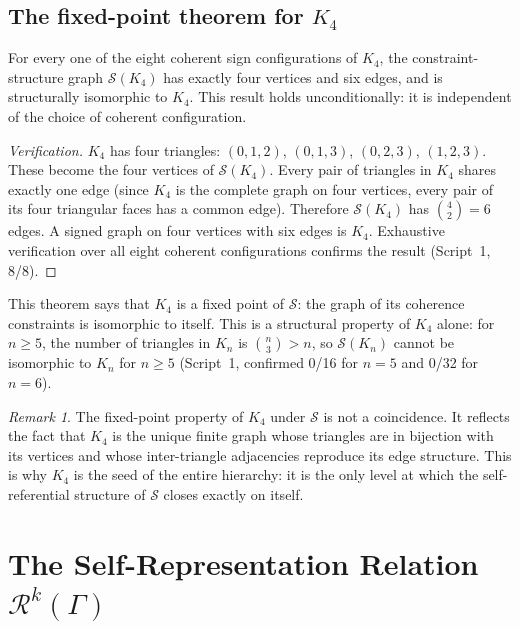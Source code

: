\documentclass[12pt,a4paper]{article}
\theoremstyle{plain}
\theoremstyle{definition}
\theoremstyle{remark}
\newtheorem{remark}[theorem]{Remark}
\newenvironment{computedresult}[1][]{%
  \begin{tcolorbox}[computedstyle,title={Computational Result\ifx\relax#1\relax\else: #1\fi}]}{\end{tcolorbox}}
\newcommand{\Kfour}{K_4}
\newcommand{\Sop}{\mathcal{S}}
\newcommand{\Rop}{\mathcal{R}}
\begin{document}
\subsection{The fixed-point theorem for \texorpdfstring{$K_4$}{K4}}

\begin{computedresult}[$\Sop(\Kfour) \cong \Kfour$ --- Script~1]
\label{thm:fixedpoint}
For every one of the eight coherent sign configurations of $\Kfour$, the
constraint-structure graph $\Sop(\Kfour)$ has exactly four vertices and six edges,
and is structurally isomorphic to $\Kfour$. This result holds unconditionally: it
is independent of the choice of coherent configuration.
\end{computedresult}

\begin{proof}[Verification]
$\Kfour$ has four triangles: $(0,1,2)$, $(0,1,3)$, $(0,2,3)$, $(1,2,3)$. These
become the four vertices of $\Sop(\Kfour)$. Every pair of triangles in $\Kfour$
shares exactly one edge (since $\Kfour$ is the complete graph on four vertices, every
pair of its four triangular faces has a common edge). Therefore $\Sop(\Kfour)$ has
$\binom{4}{2} = 6$ edges. A signed graph on four vertices with six edges is $\Kfour$.
Exhaustive verification over all eight coherent configurations confirms the result
(Script~1, 8/8).
\end{proof}

This theorem says that $\Kfour$ is a fixed point of $\Sop$: the graph of its
coherence constraints is isomorphic to itself. This is a structural property of
$\Kfour$ alone: for $n \geq 5$, the number of triangles in $K_n$ is $\binom{n}{3}
> n$, so $\Sop(K_n)$ cannot be isomorphic to $K_n$ for $n \geq 5$ (Script~1,
confirmed 0/16 for $n=5$ and 0/32 for $n=6$).

\begin{remark}
The fixed-point property of $\Kfour$ under $\Sop$ is not a coincidence. It reflects
the fact that $\Kfour$ is the unique finite graph whose triangles are in bijection
with its vertices and whose inter-triangle adjacencies reproduce its edge structure.
This is why $\Kfour$ is the seed of the entire hierarchy: it is the only level at
which the self-referential structure of $\Sop$ closes exactly on itself.
\end{remark}

\section{The Self-Representation Relation
         \texorpdfstring{$\Rop^k(\Gamma)$}{Rk(Γ)}}
\label{sec:R}
\end{document}
